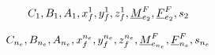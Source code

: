 





\[
    C_{1}, B_{1}, A_{1}, x_{f}^{1}, y_{f}^{1}, z_{f}^{1}, 
    \underline{M}_{e_2}^{F}, \underline{F}_{e_2}^{F}, s_{2}
\]

\[
    C_{n_e}, B_{n_e}, A_{n_e}, x_{f}^{n_e}, y_{f}^{n_e}, z_{f}^{n_e}, 
    \underline{M}_{e_{n_e}}^{F}, \underline{F}_{n_e}^{F}, s_{n_e}
\]






